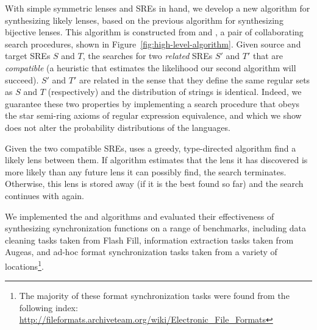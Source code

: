 \documentclass[acmsmall,screen,anonymous]{acmart}
\begin{document}
With simple symmetric lenses and SREs in hand, we develop a new algorithm for
synthesizing likely lenses, based on the previous algorithm for synthesizing
bijective lenses. This algorithm is constructed from \Expand and \GreedySynth,
a pair of collaborating search procedures, shown in
Figure~\ref{fig:high-level-algorithm}. Given source and target SREs $S$ and $T$,
the \Expand searches for two \emph{related} SREs $S'$ and $T'$ that are
\emph{compatible} (a heuristic that estimates the likelihood our second
algorithm will succeed). $S'$ and $T'$ are related in the sense that they define
the same regular sets as $S$ and $T$ (respectively) and the distribution of
strings is identical. Indeed, we guarantee these two properties by implementing
a search procedure that obeys the star semi-ring axioms of regular expression
equivalence, and which we show does not alter the probability distributions of
the languages.

Given the two compatible SREs, \GreedySynth uses a greedy, type-directed
algorithm find a likely lens between them. If algorithm estimates that the lens
it has discovered is more likely than any future lens it can possibly find, the
search terminates. Otherwise, this lens is stored away (if it is the best found
so far) and the search continues with \Expand again.

We implemented the \GreedySynth and \Expand algorithms and evaluated their
effectiveness of synthesizing synchronization functions on a range of
benchmarks, including data cleaning tasks taken from Flash Fill, information
extraction tasks taken from Augeas, and ad-hoc format synchronization tasks
taken from a variety of locations\footnote{The majority of these format
  synchronization tasks were found from the following index:
  \url{http://fileformats.archiveteam.org/wiki/Electronic_File_Formats}}.
\end{document}
